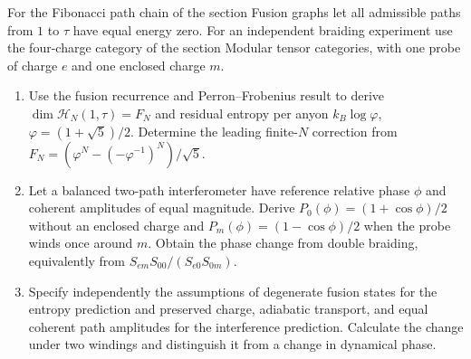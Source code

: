 \begin{exercise}
For the Fibonacci path chain of the section Fusion graphs let
all admissible paths from $1$ to $\tau$ have equal energy zero.
For an independent braiding experiment use the four-charge
category of the section Modular tensor categories, with one
probe of charge $e$ and one enclosed charge $m$.
\begin{enumerate}[label=(\alph*)]
\item Use the fusion recurrence and Perron--Frobenius result
to derive
$\dim\mathcal H_N(1,\tau)=F_N$ and residual entropy per
anyon $k_B\log\varphi$, $\varphi=(1+\sqrt5)/2$.
Determine the leading finite-$N$ correction from
$F_N=(\varphi^N-(-\varphi^{-1})^N)/\sqrt5$.
\item Let a balanced two-path interferometer have reference
relative phase $\phi$ and coherent amplitudes of equal
magnitude. Derive
$P_0(\phi)=(1+\cos\phi)/2$ without an enclosed charge and
$P_m(\phi)=(1-\cos\phi)/2$ when the probe winds once around $m$.
Obtain the phase change from double braiding, equivalently
from $S_{em}S_{00}/(S_{e0}S_{0m})$.
\item Specify independently the assumptions of degenerate
fusion states for the entropy prediction and preserved
charge, adiabatic transport, and equal coherent path amplitudes
for the interference prediction. Calculate the change under
two windings and distinguish it from a change in dynamical phase.
\end{enumerate}
\end{exercise}
